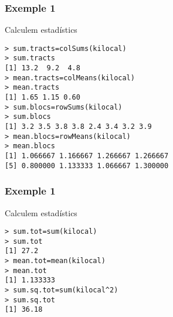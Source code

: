 \documentclass[12pt,t]{beamer}
\theoremstyle{plain}
\theoremstyle{definition}
\begin{document}
\begin{frame}[fragile]
\frametitle{Exemple 1}
Calculem estadístics
\begin{verbatim}
> sum.tracts=colSums(kilocal)
> sum.tracts
[1] 13.2  9.2  4.8
> mean.tracts=colMeans(kilocal)
> mean.tracts
[1] 1.65 1.15 0.60
> sum.blocs=rowSums(kilocal)
> sum.blocs
[1] 3.2 3.5 3.8 3.8 2.4 3.4 3.2 3.9
> mean.blocs=rowMeans(kilocal)
> mean.blocs
[1] 1.066667 1.166667 1.266667 1.266667 
[5] 0.800000 1.133333 1.066667 1.300000
\end{verbatim}
\end{frame}


\begin{frame}[fragile]
\frametitle{Exemple 1}
Calculem estadístics
\begin{verbatim}
> sum.tot=sum(kilocal)
> sum.tot
[1] 27.2
> mean.tot=mean(kilocal)
> mean.tot
[1] 1.133333
> sum.sq.tot=sum(kilocal^2)
> sum.sq.tot
[1] 36.18
\end{verbatim}
\end{frame}
\end{document}
